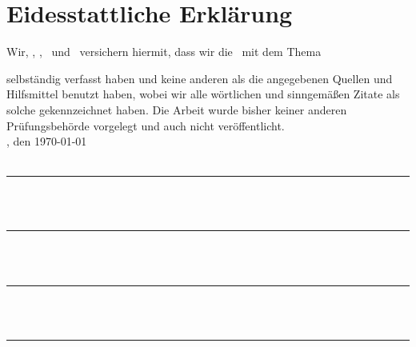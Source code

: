 \clearpage
\section*{Eidesstattliche Erklärung}
\label{sec:Eidestattliche Erklaerung}

Wir, \autorA, \autorB, \autorC \ und \autorD \ versichern hiermit, dass wir die
\art \ mit dem Thema
\begin{quote}
\textit{\untertitel}
\end{quote}
selbständig verfasst haben und keine anderen als die angegebenen Quellen und
Hilfsmittel benutzt haben, wobei wir alle wörtlichen und sinngemäßen Zitate als
solche gekennzeichnet haben. Die Arbeit wurde bisher keiner anderen
Prüfungsbehörde vorgelegt und auch nicht veröffentlicht.\\[6ex]

\ort, den \today
\\
\\
\rule[-0.2cm]{5cm}{0.5pt}

\textsc{\autorA} 
\\
\\
\rule[-0.2cm]{5cm}{0.5pt}

\textsc{\autorB}
\\
\\
\rule[-0.2cm]{5cm}{0.5pt}

\textsc{\autorC}
\\
\\
\rule[-0.2cm]{5cm}{0.5pt}

\textsc{\autorD}

